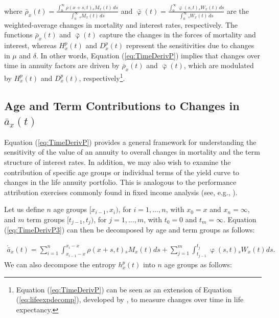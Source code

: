 \documentclass[12pt]{article}
\begin{document}
where $\bar{\rho}_x(t) = \frac{\int_0^\infty \rho(x+s,t) {}_s M_x(t) \, ds}{\int_0^\infty {}_s M_x(t) \, ds}$ and 
$\bar{\upvarphi}(t) = \frac{\int_0^\infty \upvarphi(s,t) {}_s W_x(t) \, ds}{\int_0^\infty {}_s W_x(t) \, ds}$ are the weighted-average changes in mortality and interest rates, respectively. The functions $\bar{\rho}_x(t)$ and $\bar{\upvarphi}(t)$ capture the changes in the forces of mortality and interest, whereas ${H}^{p}_x(t)$ and ${D}^{p}_x(t)$ represent the sensitivities due to changes in $\mu$ and $\delta$. In other words, Equation (\ref{eq:TimeDerivP}) implies that changes over time in annuity factors are driven by $\bar{\rho}_x(t)$ and $\bar{\upvarphi}(t)$, which are modulated by ${H}^{p}_x(t)$ and ${D}^{p}_x(t)$, respectively\footnote{Equation (\ref{eq:TimeDerivP}) can be seen as an extension of Equation (\ref{eq:lifeexpdecomp}), developed by \citet{Vaupel2003}, to measure changes over time in life expectancy.}.




\subsection{Age and Term Contributions to Changes in $\bar{a}_x(t)$}

 
 Equation (\ref{eq:TimeDerivP}) provides a general framework for understanding the sensitivity of the value of an annuity to overall changes in mortality and the term structure of interest rates. In addition, we may also wish to examine the contribution of specific age groups or individual terms of the yield curve to changes in the life annuity portfolio. This is analogous to the performance attribution exercises commonly found in fixed income analysis (see, e.g., \citet{Daul2012}).
 
 Let us define $n$ age groups $[x_{i-1}, x_i)$, for $i=1,\ldots,n$, with $x_0 = x$ and $x_n = \infty$, and $m$ term groups $[t_{j-1}, t_j)$, for $j=1,\ldots,m$, with $t_0 = 0$ and $t_m = \infty$. Equation (\ref{eq:TimeDerivP3}) can then be decomposed by age and term groups as follows:
 

\begin{equation}\label{eq:TimeDerivAge}
\begin{split}
 \acute{\bar{a}}_x(t) = \sum_{i=1}^n\int_{x_{i-1}-x}^{x_i-x}  \rho(x+s,t) {}_sM_x(t)  ds +\sum_{j=1}^m\int_{t_{j-1}}^{t_j}   \upvarphi(s,t) {}_sW_x(t)  ds.  
\end{split}
\end{equation}
We can also decompose the entropy $h_x^p(t)$ into $n$ age groups as follows:
\end{document}
